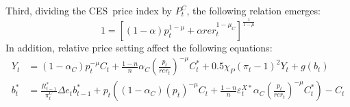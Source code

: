 \documentclass[a4paper,12pt]{article}%
\begin{document}
Third, dividing the CES\ price index by $P_{t}^{C}$, the following relation
emerges:
\begin{equation}
1=\left[  \left(  1-\alpha\right)  p_{t}^{1-\mu}+\alpha rer_{t}^{1-\mu_{C}%
}\right]  ^{\frac{1}{1-\mu}}%
\end{equation}
In addition, relative price setting affect the following equations:%
\begin{align}
Y_{t} &  =\left(  1-\alpha_{C}\right)  p_{t}^{-\mu}C_{t}+\frac{1-n}{n}%
\alpha_{C}\left(  \frac{p_{t}}{rer_{t}}\right)  ^{-\mu}C_{t}^{\ast}%
+0.5\chi_{P}\left(  \pi_{t}-1\right)  ^{2}Y_{t}+g\left(  b_{t}\right)  \\
b_{t}^{\ast} &  =\frac{R_{t-1}^{\ast}}{\pi_{t}^{C}}\Delta e_{t}b_{t-1}^{\ast
}+p_{t}\left(  \left(  1-\alpha_{C}\right)  \left(  p_{t}\right)  ^{-\mu}%
C_{t}+\frac{1-n}{n}\varepsilon_{t}^{X\ast}\alpha_{C}\left(  \frac{p_{t}%
}{rer_{t}}\right)  ^{-\mu}C_{t}^{\ast}\right)  -C_{t}%
\end{align}
%

\footnotesize

%
\normalsize
\end{document}
